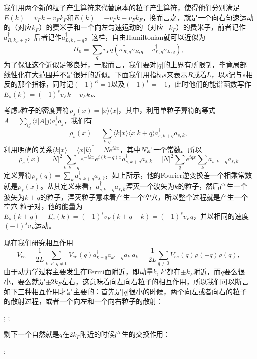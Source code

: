 \documentclass[9pt]{extarticle}
\begin{document}
我们用两个新的粒子产生算符来代替原本的粒子产生算符，使得他们分别满足$E(k)=v_Fk-v_Fk_F$和$E(k)=-v_Fk-v_Fk_F$，换而言之，就是一个向右匀速运动的（对应$k_F$）的费米子和一个向左匀速运动的（对应$-k_F$）的费米子，前者记作$a^\dag_{R,k_F+q}$，后者记作$a^\dag_{L,k_F+q}$。这样，自由Hamiltonian就可以近似为
\[
	H_0=\sum_q v_Fq(a^\dag_{R,q}a_{R,q}-a^\dag_{L,q}a_{L,q}),
\]
为了保证这个近似足够良好，一般而言，我们要对$|q|$的上界有所限制，毕竟局部线性化在大范围并不是很好的近似。下面我们用指标$s$来表示$R$或着$L$，以$\bar{s}$记与$s$相反的那个指标，同时记$(-1)^R=1$以及$(-1)^L=-1$，此时他们的能谱函数写作$E_s(k)=(-1)^sv_Fk-v_Fk_F$.

考虑$s$粒子的密度算符$\rho_s(x)=|x\rangle\langle x|$，其中，利用单粒子算符的等式$A=\sum_{ij}\langle i|A|j \rangle a_i^\dag a_j$，我们有
\[
	\rho_s(x)=\sum_{k,q}\langle k|x\rangle\langle x|k+q\rangle a_{s,k+q}^\dag a_{s,k},
\]
利用明确的关系$\langle k|x\rangle=\langle x|k\rangle^*=Ne^{ikx}$，其中$N$是一个常数。所以
\[
	\rho_s(x)=|N|^2\sum_{k,k+q}e^{-ikx}e^{i(k+q)x} a_{s,k+q}^\dag a_{s,k}=|N|^2\sum_{q}e^{iqx}\sum_{k}a_{s,k+q}^\dag a_{s,k}
\]
定义算符$\rho_{s}(q)=\sum_k a^\dag_{s,k+q}a_{s,k}$，如上所示，他的Fourier逆变换差一个相乘常数就是$\rho_s(x)$。从其定义来看，$a^\dag_{s,k+q}a_{s,k}$湮灭一个波矢为$k$的粒子，然后产生一个波矢为$k+q$的粒子，湮灭粒子意味着产生一个空穴，所以整个过程就是产生一个空穴-粒子对，他的能量为$E_s(k+q)-E_s(k)=(-1)^s v_F(k+q-k)=(-1)^s v_Fq$，并以相同的速度$(-1)^s v_F$运动。

现在我们研究相互作用
\[
	V_{ee}=\frac{1}{2L}\sum_{k,k';q\neq 0}V_{ee}(q)a^\dag_{k-q}a^{\dag}_{k'+q}a_{k'}a_k=\frac{1}{2L}\sum_{q\neq 0}V_{ee}(q)\rho(-q)\rho(q),
\]
由于动力学过程主要发生在Fermi面附近，即动量$k$, $k'$都在$\pm k_F$附近，而$q$要么很小，要么就是$\pm 2k_F$左右，这意味着向左向右粒子的相互作用，所以我们可以断言如下三种相互作用才是主要的：首先是$|q|$很小的时候，两个向左或者向右的粒子的散射过程，或者一个向左和一个向右粒子的散射：
\begin{center}
;
;
\end{center}
剩下一个自然就是$q$在$2k_F$附近的时候产生的交换作用：
\begin{center}
;
\end{center}
\end{document}
